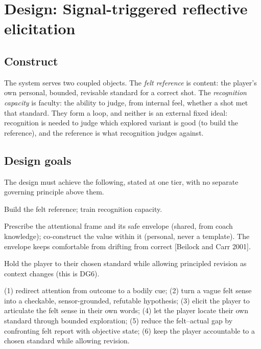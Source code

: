 \documentclass[sigconf]{acmart}
\newcommand{\Approach}{Signal-triggered reflective elicitation}
\begin{document}
\section{Design: \Approach}
\label{sec:design}

\subsection{Construct}
The system serves two coupled objects. The \emph{felt reference} is content: the player's own personal, bounded, revisable standard for a correct shot. The \emph{recognition capacity} is faculty: the ability to judge, from internal feel, whether a shot met that standard. They form a loop, and neither is an external fixed ideal: recognition is needed to judge which explored variant is good (to build the reference), and the reference is what recognition judges against.

\subsection{Design goals}
The design must achieve the following, stated at one tier, with no separate governing principle above them.

\begin{description}[leftmargin=1.2em]
  \item[Two purposes.] Build the felt reference; train recognition capacity.
  \item[Frame/value split.] Prescribe the attentional frame and its safe envelope (shared, from coach knowledge); co-construct the value within it (personal, never a template). The envelope keeps comfortable from drifting from correct [Beilock and Carr 2001].
  \item[Accountability without rigidity.] Hold the player to their chosen standard while allowing principled revision as context changes (this is DG6).
  \item[DG1--DG6.] (1) redirect attention from outcome to a bodily cue; (2) turn a vague felt sense into a checkable, sensor-grounded, refutable hypothesis; (3) elicit the player to articulate the felt sense in their own words; (4) let the player locate their own standard through bounded exploration; (5) reduce the felt--actual gap by confronting felt report with objective state; (6) keep the player accountable to a chosen standard while allowing revision.
\end{description}
\end{document}
